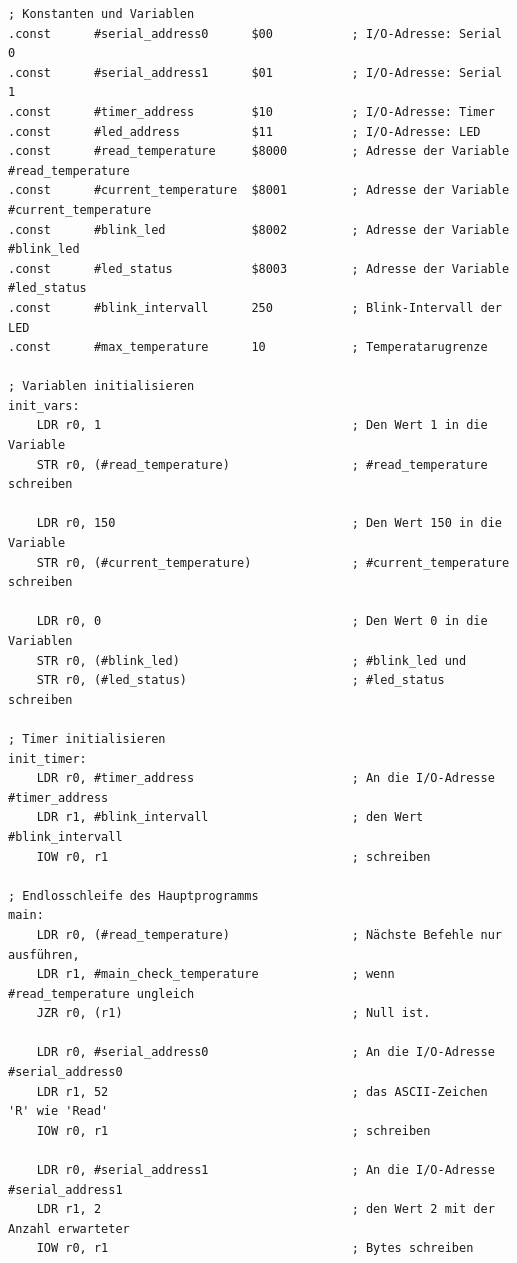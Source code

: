 {
\footnotesize

\begin{verbatim}
; Konstanten und Variablen
.const      #serial_address0      $00           ; I/O-Adresse: Serial 0
.const      #serial_address1      $01           ; I/O-Adresse: Serial 1
.const      #timer_address        $10           ; I/O-Adresse: Timer
.const      #led_address          $11           ; I/O-Adresse: LED
.const      #read_temperature     $8000         ; Adresse der Variable #read_temperature
.const      #current_temperature  $8001         ; Adresse der Variable #current_temperature
.const      #blink_led            $8002         ; Adresse der Variable #blink_led
.const      #led_status           $8003         ; Adresse der Variable #led_status
.const      #blink_intervall      250           ; Blink-Intervall der LED
.const      #max_temperature      10            ; Temperatarugrenze

; Variablen initialisieren
init_vars:
    LDR r0, 1                                   ; Den Wert 1 in die Variable
    STR r0, (#read_temperature)                 ; #read_temperature schreiben

    LDR r0, 150                                 ; Den Wert 150 in die Variable
    STR r0, (#current_temperature)              ; #current_temperature schreiben

    LDR r0, 0                                   ; Den Wert 0 in die Variablen
    STR r0, (#blink_led)                        ; #blink_led und
    STR r0, (#led_status)                       ; #led_status schreiben

; Timer initialisieren
init_timer:
    LDR r0, #timer_address                      ; An die I/O-Adresse #timer_address
    LDR r1, #blink_intervall                    ; den Wert #blink_intervall
    IOW r0, r1                                  ; schreiben

; Endlosschleife des Hauptprogramms
main:
    LDR r0, (#read_temperature)                 ; Nächste Befehle nur ausführen,
    LDR r1, #main_check_temperature             ; wenn #read_temperature ungleich
    JZR r0, (r1)                                ; Null ist.

    LDR r0, #serial_address0                    ; An die I/O-Adresse #serial_address0
    LDR r1, 52                                  ; das ASCII-Zeichen 'R' wie 'Read'
    IOW r0, r1                                  ; schreiben

    LDR r0, #serial_address1                    ; An die I/O-Adresse #serial_address1
    LDR r1, 2                                   ; den Wert 2 mit der Anzahl erwarteter
    IOW r0, r1                                  ; Bytes schreiben


\end{verbatim}}
